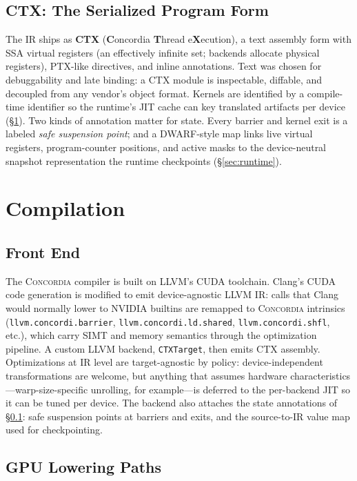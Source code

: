 \documentclass[sigplan,nonacm]{acmart}
\newcommand{\sys}{\textsc{Concordia}\xspace}
\newcommand{\etc}{etc.\xspace}
\begin{document}
\subsection{CTX: The Serialized Program Form}
\label{sec:ir-ctx}

The IR ships as \textbf{CTX} (\textbf{C}oncordia \textbf{T}hread
e\textbf{X}ecution), a text assembly form with SSA virtual
registers (an effectively infinite set; backends allocate physical
registers), PTX-like directives, and inline annotations.  Text was chosen for
debuggability and late binding: a CTX module is inspectable, diffable, and
decoupled from any vendor's object format.  Kernels are identified by a
compile-time identifier so the runtime's JIT cache can key translated
artifacts per device (\S\ref{sec:compilation}).  Two kinds of annotation
matter for state.  Every barrier and kernel exit is a labeled \emph{safe
suspension point}; and a DWARF-style map links live virtual registers,
program-counter positions, and active masks to the device-neutral snapshot
representation the runtime checkpoints (\S\ref{sec:runtime}).

\section{Compilation}
\label{sec:compilation}

\subsection{Front End}
\label{sec:frontend}

The \sys compiler is built on LLVM's CUDA toolchain.  Clang's CUDA code
generation is modified to emit device-agnostic LLVM IR: calls that Clang
would normally lower to NVIDIA builtins are remapped to \sys intrinsics
(\texttt{llvm.concordi.barrier}, \texttt{llvm.concordi.ld.shared},
\texttt{llvm.concordi.shfl}, \etc), which carry SIMT and memory semantics
through the optimization pipeline.  A custom LLVM backend, \texttt{CTXTarget},
then emits CTX assembly.  Optimizations at IR level are target-agnostic by
policy: device-independent transformations are welcome, but anything that
assumes hardware characteristics---warp-size-specific unrolling, for
example---is deferred to the per-backend JIT so it can be tuned per device.
The backend also attaches the state annotations of \S\ref{sec:ir-ctx}: safe
suspension points at barriers and exits, and the source-to-IR value map used
for checkpointing.

\subsection{GPU Lowering Paths}
\label{sec:gpu-lowering}
\end{document}
